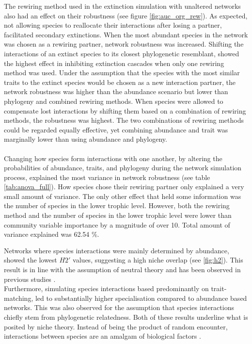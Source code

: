 \documentclass[12pt,a4paper]{article}
\begin{document}
The rewiring method used in the extinction simulation with unaltered networks also had an effect on their robustness (see figure \ref{fig:auc_org_rew}). As expected, not allowing species to reallocate their interactions after losing a partner, facilitated secondary extinctions. When the most abundant species in the network was chosen as a rewiring partner, network robustness was increased. Shifting the interactions of an extinct species to its closest phylogenetic resemblant, showed the highest effect in inhibiting extinction cascades when only one rewiring method was used. Under the assumption that the species with the most similar traits to the extinct species would be chosen as a new interaction partner, the network robustness was higher than the abundance scenario but lower than phylogeny and combined rewiring methods. When species were allowed to compensate lost interactions by shifting them based on a combination of rewiring methods, the robustness was highest. The two combinations of rewiring methods could be regarded equally effective, yet combining abundance and trait was marginally lower than using abundance and phylogeny. \paragraph{}

Changing how species form interactions with one another, by altering the probabilities of abundance, traits, and phylogeny during the network simulation process, explained the most variance in network robustness (see table \ref{tab:anova_full}). How species chose their rewiring partner only explained a very small amount of variance. The only other effect that held some information was the number of species in the lower trophic level. However, both the rewiring method and the number of species in the lower trophic level were lower than community variable importance by a magnitude of over 10. Total amount of variance explained was 62.54 \%.

Networks where species interactions were mainly determined by abundance, showed the lowest $H2'$ values, suggesting a high niche overlap (see \ref{fig:h2}). This result is in line with the assumption of neutral theory and has been observed in previous studies \parencite{Vazquez2005, Vazquez2007}. \\
Furthermore, simulating species interactions based predominantly on trait-matching, led to substantially higher specialisation compared to abundance based networks. This was also observed for the assumption that species interactions chiefly stem from phylogenetic relatedness. Both of these results underline what is posited by niche theory. Instead of being the product of random encounter, interactions between species are an amalgam of biological factors \parencite{Jordano2003, Rezende2007, Vazquez2009, Olesen2011}. \par
\end{document}
